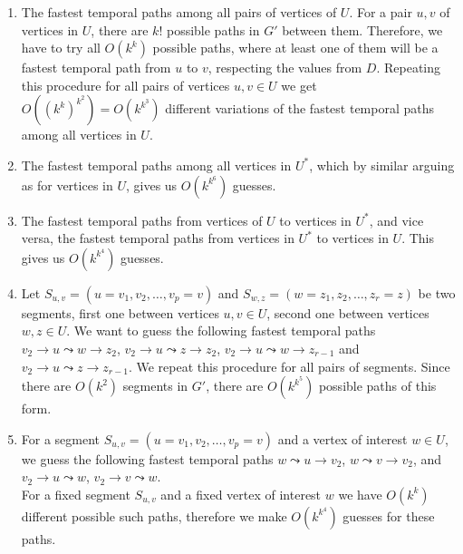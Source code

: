 \documentclass[11pt,a4paper]{article}
\theoremstyle{remark}
\theoremstyle{definition}
\newcommand{\deltaExact}{\textsc{Simple $\Delta$-TGR}}
\begin{document}
\begin{enumerate}
    \item The fastest temporal paths among all pairs of vertices of $U$.
    For a pair $u,v$ of vertices in $U$, there are $k!$ possible paths in $G'$ between them. 
    Therefore, we have to try all $O(k^k)$ possible paths, where at least one of them will be a fastest temporal path from $u$ to $v$, respecting the values from $D$.
    Repeating this procedure for all pairs of vertices $u,v \in U$ we get $O((k^k)^{k^2})=O(k^{k^3})$ different variations of the fastest temporal paths among all vertices in $U$.
    \item The fastest temporal paths among all vertices in $U^*$, 
    which by similar arguing as for vertices in $U$, gives us $O(k^{k^6})$ guesses.
    \item The fastest temporal paths from vertices of $U$ to vertices in $U^*$,
    and vice versa, the fastest temporal paths from vertices in $U^*$ to vertices in $U$.
    This gives us $O(k^{k^4})$ guesses.
    \item Let $S_{u,v} = (u=v_1,v_2, \dots, v_p = v)$ and $S_{w,z} = (w=z_1,z_2, \dots, z_r = z)$ be two segments,
    first one between vertices $u,v \in U$, second one between vertices $w, z \in U$.
    We want to guess the following fastest temporal paths
    $v_2 \rightarrow u \leadsto w \rightarrow z_2$,
    $v_2 \rightarrow u \leadsto z \rightarrow z_2$,
    $v_2 \rightarrow u \leadsto w \rightarrow z_{r-1}$ and
    $v_2 \rightarrow u \leadsto z \rightarrow z_{r-1}$.
    We repeat this procedure for all pairs of segments.
    Since there are $O(k^2)$ segments in $G'$,
    there are $O(k^{k^5})$ possible paths of this form.
    \item \label{FPT:guess-uToSegment}
    For a segment $S_{u,v} = (u=v_1,v_2, \dots, v_p = v)$
    and a vertex of interest $w \in U$,
    we guess the following fastest temporal paths
    $w \leadsto u \rightarrow v_2$, $w \leadsto v \rightarrow v_2$,
    and
    $v_2 \rightarrow u \leadsto w$, $v_2 \rightarrow v \leadsto w$.
    \\
    For a fixed segment $S_{u,v}$ and a fixed vertex of interest $w$ we have $O(k^k)$ different possible such paths, therefore we make $O(k^{k^4})$ guesses for these paths.

\end{enumerate}
\end{document}
